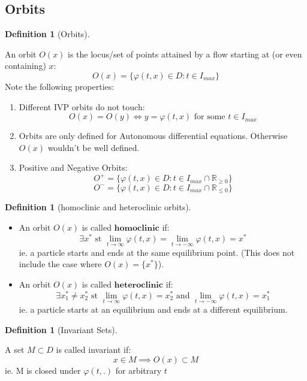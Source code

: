 \documentclass{article}
\newtheorem{defn}[thm]{Definition}
\begin{document}
\subsection{Orbits}
\begin{defn}[Orbits]
\end{defn}
An orbit $O(x)$ is the locus/set of points attained by a flow starting at (or even containing) $x$:
\[O(x) = \{\varphi(t, x) \in D : t \in I_{max}\}\]
Note the following properties:
\begin{enumerate}
    \item Different IVP orbits do not touch: 
    \[O(x) = O(y) \iff y = \varphi(t, x) \text{ for some } t \in I_{max}\]
    
    \item Orbits are only defined for Autonomous differential equations. Otherwise $O(x)$ wouldn't be well defined.
    
    \item Positive and Negative Orbits: 
    \[O^+ = \{\varphi(t, x) \in D : t \in I_{max}\cap\mathbb{R}_{\geq 0}\}\]
    \[O^- = \{\varphi(t, x) \in D : t \in I_{max}\cap\mathbb{R}_{\leq 0}\}\]

\end{enumerate}

\begin{defn}[homoclinic and heteroclinic orbits]
\end{defn}
\begin{itemize}
    \item An orbit $O(x)$ is called $\boldsymbol{homoclinic}$ if: 
    \[ \exists x^* \text{ st } \lim_{t\to\infty}\varphi(t, x) = \lim_{t\to- \infty}\varphi(t, x)  = x^* \]
    ie. a particle starts and ends at the same equilibrium point. (This does not include the case where $O(x) = \{x^*\}$).

    \item An orbit $O(x)$ is called $\boldsymbol{heteroclinic}$ if: 
    \[ \exists x_1^* \neq x_2^* \text{ st } \lim_{t\to\infty}\varphi(t, x) = x_2^* \text{ and }\lim_{t\to- \infty}\varphi(t, x)  = x_1^* \]
    ie. a particle starts at an equilibrium and ends at a different equilibrium.
    
\end{itemize}
\begin{defn}[Invariant Sets]
\end{defn}
A set $M \subset D$ is called invariant if:
\[x \in M \implies O(x) \subset M\]
ie. M is closed under $\varphi(t, .)$ for arbitrary $t$
\end{document}
